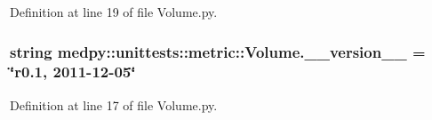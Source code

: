 Definition at line 19 of file Volume.py.

\hypertarget{namespacemedpy_1_1unittests_1_1metric_1_1Volume_a29ede6385cb19ddea103d60ad57c4ba0}{
\subsubsection[{\_\-\_\-version\_\-\_\-}]{\setlength{\rightskip}{0pt plus 5cm}string {\bf medpy::unittests::metric::Volume.\_\-\_\-version\_\-\_\-} = \char`\"{}r0.1, 2011-\/12-\/05\char`\"{}}}
\label{namespacemedpy_1_1unittests_1_1metric_1_1Volume_a29ede6385cb19ddea103d60ad57c4ba0}


Definition at line 17 of file Volume.py.

